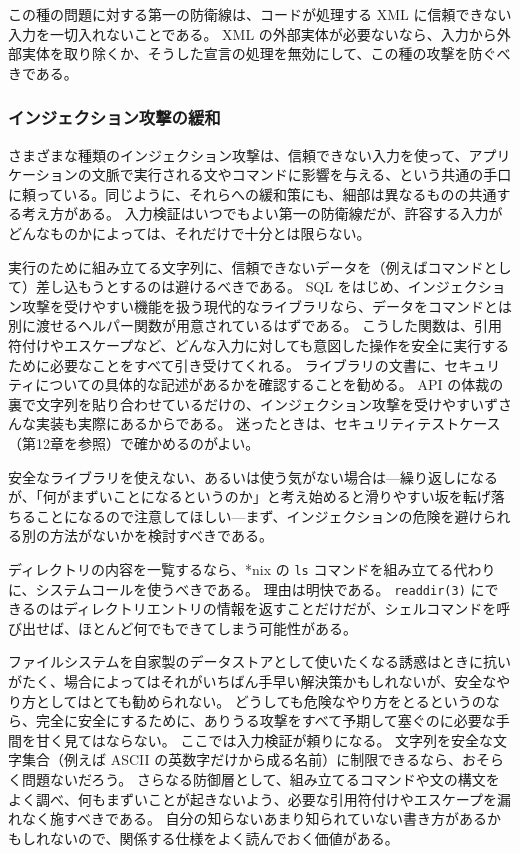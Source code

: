 \documentclass[uplatex]{jsarticle}
\def\label#1{}%
\begin{document}
この種の問題に対する第一の防衛線は、コードが処理する XML に信頼できない入力を一切入れないことである。
XML の外部実体が必要ないなら、入力から外部実体を取り除くか、そうした宣言の処理を無効にして、この種の攻撃を防ぐべきである。

\subsubsection{インジェクション攻撃の緩和}

さまざまな種類のインジェクション攻撃は、信頼できない入力を使って、アプリケーションの文脈で実行される文やコマンドに影響を与える、という共通の手口に頼っている。同じように、それらへの緩和策にも、細部は異なるものの共通する考え方がある。
入力検証はいつでもよい第一の防衛線だが、許容する入力がどんなものかによっては、それだけで十分とは限らない。

実行のために組み立てる文字列に、信頼できないデータを（例えばコマンドとして）差し込もうとするのは避けるべきである。
SQL をはじめ、インジェクション攻撃を受けやすい機能を扱う現代的なライブラリなら、データをコマンドとは別に渡せるヘルパー関数が用意されているはずである。
こうした関数は、引用符付けやエスケープなど、どんな入力に対しても意図した操作を安全に実行するために必要なことをすべて引き受けてくれる。
ライブラリの文書に、セキュリティについての具体的な記述があるかを確認することを勧める。
API の体裁の裏で文字列を貼り合わせているだけの、インジェクション攻撃を受けやすいずさんな実装も実際にあるからである。
迷ったときは、セキュリティテストケース（第12章を参照）で確かめるのがよい。

安全なライブラリを使えない、あるいは使う気がない場合は---繰り返しになるが、「何がまずいことになるというのか」と考え始めると滑りやすい坂を転げ落ちることになるので注意してほしい---まず、インジェクションの危険を避けられる別の方法がないかを検討すべきである。

\begin{exa}[シェルコマンドの代わりにシステムコールを使う]\label{exa:ch10-readdir}
ディレクトリの内容を一覧するなら、*nix の \texttt{ls} コマンドを組み立てる代わりに、システムコールを使うべきである。
理由は明快である。
\texttt{readdir(3)} にできるのはディレクトリエントリの情報を返すことだけだが、シェルコマンドを呼び出せば、ほとんど何でもできてしまう可能性がある。
\end{exa}

ファイルシステムを自家製のデータストアとして使いたくなる誘惑はときに抗いがたく、場合によってはそれがいちばん手早い解決策かもしれないが、安全なやり方としてはとても勧められない。
どうしても危険なやり方をとるというのなら、完全に安全にするために、ありうる攻撃をすべて予期して塞ぐのに必要な手間を甘く見てはならない。
ここでは入力検証が頼りになる。
文字列を安全な文字集合（例えば ASCII の英数字だけから成る名前）に制限できるなら、おそらく問題ないだろう。
さらなる防御層として、組み立てるコマンドや文の構文をよく調べ、何もまずいことが起きないよう、必要な引用符付けやエスケープを漏れなく施すべきである。
自分の知らないあまり知られていない書き方があるかもしれないので、関係する仕様をよく読んでおく価値がある。
\end{document}
